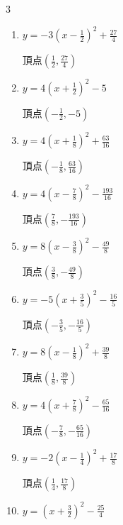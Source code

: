 \begin{multicols}{3}
\begin{enumerate}
        $\displaystyle 頂点\left( \frac{3}{8} , \frac{9}{8} \right)$

  \item $\displaystyle y=-3\left( x-\frac{1}{2}\right)^{2}+\frac{27}{4}$

        $\displaystyle 頂点\left( \frac{1}{2} , \frac{27}{4} \right)$

  \item $\displaystyle y=4\left( x+\frac{1}{2}\right)^{2}-5$

        $\displaystyle 頂点\left( -\frac{1}{2} , -5 \right)$

  \item $\displaystyle y=4\left( x+\frac{1}{8}\right)^{2}+\frac{63}{16}$

        $\displaystyle 頂点\left( -\frac{1}{8} , \frac{63}{16} \right)$

  \item $\displaystyle y=4\left( x-\frac{7}{8}\right)^{2}-\frac{193}{16}$

        $\displaystyle 頂点\left( \frac{7}{8} , -\frac{193}{16} \right)$

  \item $\displaystyle y=8\left( x-\frac{3}{8}\right)^{2}-\frac{49}{8}$

        $\displaystyle 頂点\left( \frac{3}{8} , -\frac{49}{8} \right)$

  \item $\displaystyle y=-5\left( x+\frac{3}{5}\right)^{2}-\frac{16}{5}$

        $\displaystyle 頂点\left( -\frac{3}{5} , -\frac{16}{5} \right)$

  \item $\displaystyle y=8\left( x-\frac{1}{8}\right)^{2}+\frac{39}{8}$

        $\displaystyle 頂点\left( \frac{1}{8} , \frac{39}{8} \right)$

\columnbreak %

  \item $\displaystyle y=4\left( x+\frac{7}{8}\right)^{2}-\frac{65}{16}$

        $\displaystyle 頂点\left( -\frac{7}{8} , -\frac{65}{16} \right)$

  \item $\displaystyle y=-2\left( x-\frac{1}{4}\right)^{2}+\frac{17}{8}$

        $\displaystyle 頂点\left( \frac{1}{4} , \frac{17}{8} \right)$

  \item $\displaystyle y=\left( x+\frac{3}{2}\right)^{2}-\frac{25}{4}$


\end{enumerate}
\end{multicols}
